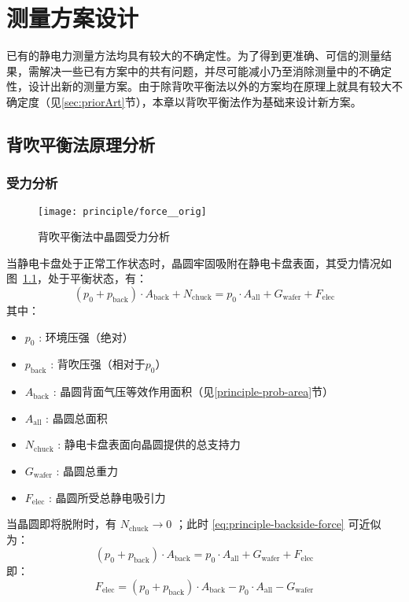 \chapter{测量方案设计}\label{ch:principle}

已有的静电力测量方法均具有较大的不确定性。为了得到更准确、可信的测量结果，需解决一些已有方案中的共有问题，并尽可能减小乃至消除测量中的不确定性，设计出新的测量方案。由于除背吹平衡法以外的方案均在原理上就具有较大不确定度（见\ref{sec:priorArt}节），本章以背吹平衡法作为基础来设计新方案。



\section{背吹平衡法原理分析}\label{sec:principle-backside}


\subsection{受力分析}\label{sec:principle-backside-force}

\begin{figure}[tbh]
\centering
\texttt{[image: principle/force\_\_orig]}
\caption{背吹平衡法中晶圆受力分析}
\label{fig:principle-backside-force}
\end{figure}

当静电卡盘处于正常工作状态时，晶圆牢固吸附在静电卡盘表面，其受力情况如图~\ref{fig:principle-backside-force}，处于平衡状态，有：
\begin{equation}
\label{eq:principle-backside-force}
(p_{0} + p_{\mathrm{back}}) \cdot A_{\mathrm{back}} + N_{\mathrm{chuck}} = p_0 \cdot A_{\mathrm{all}} + G_{\mathrm{wafer}} + F_{\mathrm{elec}}
\end{equation}
其中：
\begin{itemize}
  \item $p_{0}$ : 环境压强（绝对）
  \item $p_{\mathrm{back}}$  : 背吹压强（相对于$p_{0}$）
  \item $A_{\mathrm{back}}$  : 晶圆背面气压等效作用面积（见\ref{principle-prob-area}节）
  \item $A_{\mathrm{all}}$   : 晶圆总面积
  \item $N_{\mathrm{chuck}}$ : 静电卡盘表面向晶圆提供的总支持力
  \item $G_{\mathrm{wafer}}$ : 晶圆总重力
  \item $F_{\mathrm{elec}}$  : 晶圆所受总静电吸引力
\end{itemize}
当晶圆即将脱附时，有 $N_{\mathrm{chuck}} \to 0$ ；此时 \eqref{eq:principle-backside-force} 可近似为：
\[
(p_{0} + p_{\mathrm{back}}) \cdot A_{\mathrm{back}} = p_0 \cdot A_{\mathrm{all}} + G_{\mathrm{wafer}} + F_{\mathrm{elec}}
\]
即：
\begin{equation}
\label{eq:principle-backside-force-derived}
F_{\mathrm{elec}} = (p_{0} + p_{\mathrm{back}}) \cdot A_{\mathrm{back}} - p_0 \cdot A_{\mathrm{all}} - G_{\mathrm{wafer}}
\end{equation}

